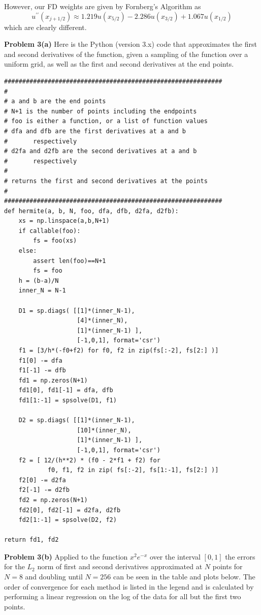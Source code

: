 \documentclass[12pt]{article}
\newcommand{\problem}[1]{\hspace{-4 ex} \large \textbf{Problem #1} }
\begin{document}
However, our FD weights are given by Fornberg's Algorithm as
$$
u^{\prime\prime}(x_{j+1/2}) \approx 1.219u(x_{5/2}) - 2.286u(x_{3/2}) + 1.067u(x_{1/2})
$$
which are clearly different.
\bigbreak


\problem{3(a)} Here is the Python (version 3.x) code that approximates the first and second derivatives of the function, given a sampling of the function over a uniform grid, as well as the first and second derivatives at the end points. 
\begin{lstlisting}
############################################################
#
# a and b are the end points
# N+1 is the number of points including the endpoints
# foo is either a function, or a list of function values
# dfa and dfb are the first derivatives at a and b 
# 		respectively
# d2fa and d2fb are the second derivatives at a and b 
# 		respectively
# 
# returns the first and second derivatives at the points
#
############################################################
def hermite(a, b, N, foo, dfa, dfb, d2fa, d2fb):
	xs = np.linspace(a,b,N+1)
	if callable(foo):
		fs = foo(xs)
	else:
		assert len(foo)==N+1
		fs = foo
	h = (b-a)/N
	inner_N = N-1
	
	D1 = sp.diags( [[1]*(inner_N-1), 
					[4]*(inner_N),
					[1]*(inner_N-1) ],
					[-1,0,1], format='csr')
	f1 = [3/h*(-f0+f2) for f0, f2 in zip(fs[:-2], fs[2:] )]
	f1[0] -= dfa
	f1[-1] -= dfb
	fd1 = np.zeros(N+1)
	fd1[0], fd1[-1] = dfa, dfb
	fd1[1:-1] = spsolve(D1, f1)
	
	D2 = sp.diags( [[1]*(inner_N-1),
					[10]*(inner_N),
					[1]*(inner_N-1) ], 
					[-1,0,1], format='csr')
	f2 = [ 12/(h**2) * (f0 - 2*f1 + f2) for
		 	f0, f1, f2 in zip( fs[:-2], fs[1:-1], fs[2:] )]
	f2[0] -= d2fa
	f2[-1] -= d2fb
	fd2 = np.zeros(N+1)
	fd2[0], fd2[-1] = d2fa, d2fb
	fd2[1:-1] = spsolve(D2, f2)

return fd1, fd2
\end{lstlisting}
\bigbreak


\problem{3(b)} Applied to the function $x^2e^{-x}$ over the interval $[0,1]$ the errors for the $L_2$ norm of first and second derivatives approximated at $N$ points for $N=8$ and doubling until $N=256$ can be seen in the table and plots below. The order of convergence for each method is listed in the legend and is calculated by performing a linear regression on the log of the data for all but the first two points. \\
\end{document}
